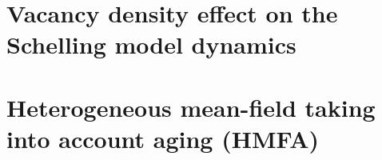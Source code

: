 \documentclass[
	10pt, %
	a4paper,
]{LegrandOrangeBook}
\begin{document}
\cleardoublepage %
{} %
\printindex %


\chapterimage{} %
\chapterspaceabove{6.75cm} %
\chapterspacebelow{7.25cm} %

\begin{appendices}

\renewcommand{\chaptername}{Appendix} %


\chapterspaceabove{6.75cm}
\chapterspacebelow{7cm}

\chapter{\label{app:Vacancy density effect on the Schelling model dynamics} Vacancy density effect on the Schelling model dynamics}




\chapterspaceabove{6.75cm}
\chapterspacebelow{7cm}

\chapter{\label{appendix_HMFA} Heterogeneous mean-field taking into account aging (HMFA)}




\end{appendices}
\end{document}
